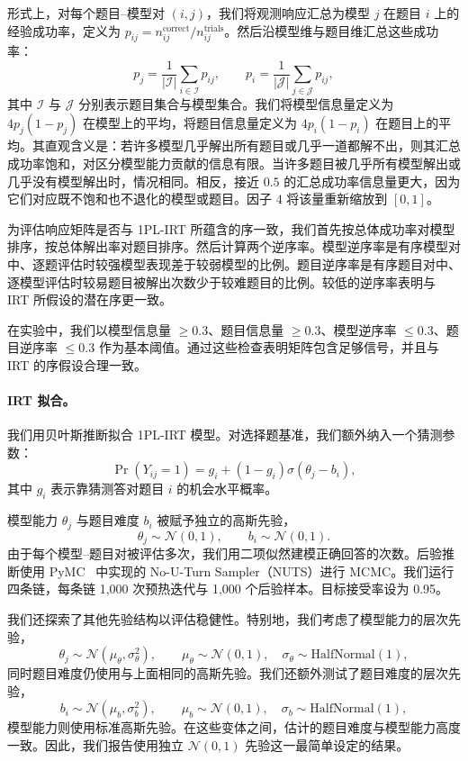 形式上，对每个题目--模型对 $(i,j)$，我们将观测响应汇总为模型 $j$ 在题目 $i$ 上的经验成功率，定义为 $p_{ij}=n_{ij}^{\mathrm{correct}}/n_{ij}^{\mathrm{trials}}$。然后沿模型维与题目维汇总这些成功率：
\[
p_j=\frac{1}{|\mathcal I|}\sum_{i\in\mathcal I} p_{ij}, \qquad
p_i=\frac{1}{|\mathcal J|}\sum_{j\in\mathcal J} p_{ij},
\]
其中 $\mathcal I$ 与 $\mathcal J$ 分别表示题目集合与模型集合。我们将模型信息量定义为 $4p_j(1-p_j)$ 在模型上的平均，将题目信息量定义为 $4p_i(1-p_i)$ 在题目上的平均。其直观含义是：若许多模型几乎解出所有题目或几乎一道都解不出，则其汇总成功率饱和，对区分模型能力贡献的信息有限。当许多题目被几乎所有模型解出或几乎没有模型解出时，情况相同。相反，接近 $0.5$ 的汇总成功率信息量更大，因为它们对应既不饱和也不退化的模型或题目。因子 $4$ 将该量重新缩放到 $[0,1]$。

为评估响应矩阵是否与 1PL-IRT 所蕴含的序一致，我们首先按总体成功率对模型排序，按总体解出率对题目排序。然后计算两个逆序率。模型逆序率是有序模型对中、逐题评估时较强模型表现差于较弱模型的比例。题目逆序率是有序题目对中、逐模型评估时较易题目被解出次数少于较难题目的比例。较低的逆序率表明与 IRT 所假设的潜在序更一致。

在实验中，我们以模型信息量 $\ge 0.3$、题目信息量 $\ge 0.3$、模型逆序率 $\le 0.3$、题目逆序率 $\le 0.3$ 作为基本阈值。通过这些检查表明矩阵包含足够信号，并且与 IRT 的序假设合理一致。

\paragraph{IRT 拟合。} 我们用贝叶斯推断拟合 1PL-IRT 模型。对选择题基准，我们额外纳入一个猜测参数：
\[
\Pr(Y_{ij}=1)=g_i+(1-g_i)\sigma(\theta_j-b_i),
\]
其中 \(g_i\) 表示靠猜测答对题目 \(i\) 的机会水平概率。

模型能力 $\theta_j$ 与题目难度 $b_i$ 被赋予独立的高斯先验，
\[
\theta_j \sim \mathcal{N}(0,1), \qquad
b_i \sim \mathcal{N}(0,1).
\]
由于每个模型–题目对被评估多次，我们用二项似然建模正确回答的次数。后验推断使用 PyMC~\cite{pymc2023} 中实现的 No-U-Turn Sampler（NUTS）进行 MCMC。我们运行四条链，每条链 1{,}000 次预热迭代与 1{,}000 个后验样本。目标接受率设为 0.95。

我们还探索了其他先验结构以评估稳健性。特别地，我们考虑了模型能力的层次先验，
\[
\theta_j \sim \mathcal{N}(\mu_\theta,\sigma_\theta^2), \qquad
\mu_\theta \sim \mathcal{N}(0,1), \quad
\sigma_\theta \sim \text{HalfNormal}(1),
\]
同时题目难度仍使用与上面相同的高斯先验。我们还额外测试了题目难度的层次先验，
\[
b_i \sim \mathcal{N}(\mu_b,\sigma_b^2), \qquad
\mu_b \sim \mathcal{N}(0,1), \quad
\sigma_b \sim \text{HalfNormal}(1),
\]
模型能力则使用标准高斯先验。在这些变体之间，估计的题目难度与模型能力高度一致。因此，我们报告使用独立 $\mathcal{N}(0,1)$ 先验这一最简单设定的结果。

